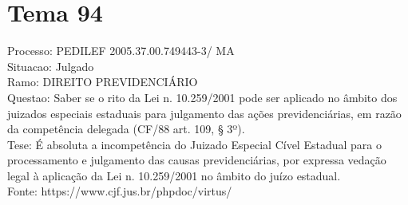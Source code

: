 \documentclass[12pt]{article}
\begin{document}
\section*{Tema 94}
Processo: PEDILEF 2005.37.00.749443-3/ MA\\
Situacao: Julgado\\
Ramo: DIREITO PREVIDENCIÁRIO\\
Questao: Saber se o rito da Lei n. 10.259/2001 pode ser aplicado no âmbito dos juizados especiais estaduais para julgamento das ações previdenciárias, em razão da competência delegada (CF/88 art. 109, § 3º).\\
Tese: É absoluta a incompetência do Juizado Especial Cível Estadual para o processamento e julgamento das causas previdenciárias, por expressa vedação legal à aplicação da Lei n. 10.259/2001 no âmbito do juízo estadual.\\
Fonte: https://www.cjf.jus.br/phpdoc/virtus/
\end{document}
